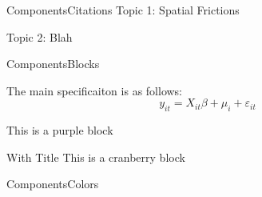 \documentclass[aspectratio=169]{beamer}
\begin{document}
\begin{frame}{Components}{Citations}
    Topic 1: Spatial Frictions
    \begin{citecolor}
    \end{citecolor}

    \vspace{5mm}
    Topic 2: Blah 
    \begin{citecolor}
    \end{citecolor}
\end{frame}

\begin{frame}{Components}{Blocks}
  \begin{block}{}
    The main specificaiton is as follows: 
    $$
    y_{it} = X_{it} \beta + \mu_i + \varepsilon_{it}
    $$
  \end{block}

  \begin{purpleBlock}{}
      This is a purple block
  \end{purpleBlock}

  \begin{cranberryBlock}{With Title}
    This is a cranberry block
  \end{cranberryBlock}
\end{frame}

\begin{frame}{Components}{Colors}








\end{frame}
\end{document}
